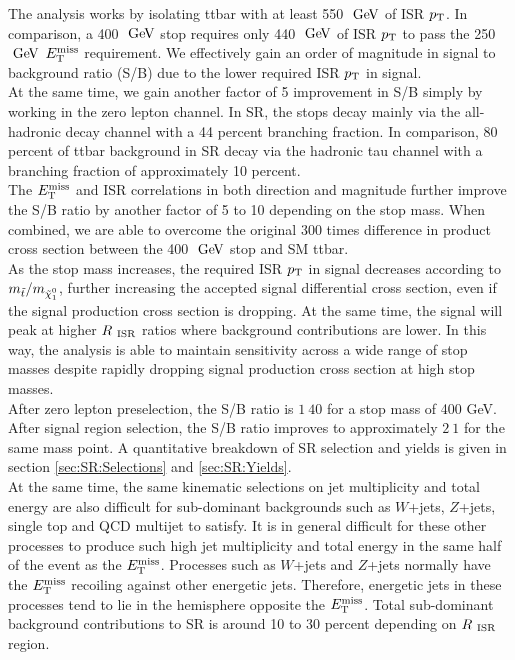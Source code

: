 \indent The analysis works by isolating ttbar with at least 550 $\gev$ of ISR $p_{\mathrm{T}}$.  In comparison, a 400 $\gev$ stop requires only 440 $\gev$ of ISR $p_{\mathrm{T}}$ to pass the 250 $\gev$ $E_{\mathrm{T}}^{\mathrm{miss}}$ requirement.  We effectively gain an order of magnitude in signal to background ratio (S/B) due to the lower required ISR $p_{\mathrm{T}}$ in signal.  \\

\indent At the same time, we gain another factor of 5 improvement in S/B simply by working in the zero lepton channel.  In SR, the stops decay mainly via the all-hadronic decay channel with a 44 percent branching fraction.  In comparison, 80 percent of ttbar background in SR decay via the hadronic tau channel with a branching fraction of approximately 10 percent.  \\

\indent The $E_{\mathrm{T}}^{\mathrm{miss}}$ and ISR correlations in both direction and magnitude further improve the S/B ratio by another factor of 5 to 10 depending on the stop mass.  When combined, we are able to overcome the original 300 times difference in product cross section between the 400 $\gev$ stop and SM ttbar.  \\

\indent As the stop mass increases, the required ISR $p_{\mathrm{T}}$ in signal decreases according to $m_{\stop}/m_{\ninoone}$, further increasing the accepted signal differential cross section, even if the signal production cross section is dropping.  At the same time, the signal will peak at higher $R_{~\mathrm{ISR}}$ ratios where background contributions are lower.  In this way, the analysis is able to maintain sensitivity across a wide range of stop masses despite rapidly dropping signal production cross section at high stop masses.  \\

\indent After zero lepton preselection, the S/B ratio is $1\:40$ for a stop mass of 400 GeV.  After signal region selection, the S/B ratio improves to approximately $2\:1$ for the same mass point.  A quantitative breakdown of SR selection and yields is given in section \ref{sec:SR:Selections} and \ref{sec:SR:Yields}.  \\

\indent At the same time, the same kinematic selections on jet multiplicity and total energy are also difficult for sub-dominant backgrounds such as $W$+jets, $Z$+jets, single top and QCD multijet to satisfy.  It is in general difficult for these other processes to produce such high jet multiplicity and total energy in the same half of the event as the $E_{\mathrm{T}}^{\mathrm{miss}}$.   Processes such as $W$+jets and $Z$+jets normally have the $E_{\mathrm{T}}^{\mathrm{miss}}$ recoiling against other energetic jets.  Therefore, energetic jets in these processes tend to lie in the hemisphere opposite the $E_{\mathrm{T}}^{\mathrm{miss}}$.  Total sub-dominant background contributions to SR is around 10 to 30 percent depending on $R_{~\mathrm{ISR}}$ region.  \\

